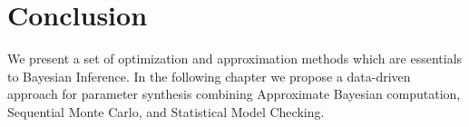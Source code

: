 \section{Conclusion}
We present a set of optimization and approximation methods which are essentials to Bayesian Inference. In the following chapter we propose a data-driven approach for parameter synthesis combining Approximate Bayesian computation, Sequential Monte Carlo, and Statistical Model Checking.
